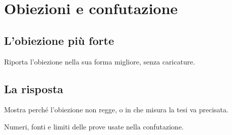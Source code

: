 \chapter{Obiezioni e confutazione}

\section{L'obiezione più forte}
Riporta l'obiezione nella sua forma migliore, senza caricature.

\section{La risposta}
Mostra perché l'obiezione non regge, o in che misura la tesi va precisata.

\begin{boxdati}
Numeri, fonti e limiti delle prove usate nella confutazione.
\end{boxdati}
